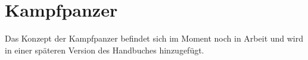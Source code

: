 \section{Kampfpanzer}
Das Konzept der Kampfpanzer befindet sich im Moment noch in Arbeit und wird in einer späteren Version des Handbuches hinzugefügt.